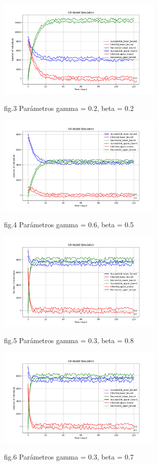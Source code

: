         \begin{center}
            \includegraphics[width=0.6\textwidth]{images/plot0.png}
            \begin{center}
               fig.3 Parámetros  gamma = 0.2, beta = 0.2
            \end{center}
            
            \includegraphics[width=0.6\textwidth]{images/plot1.png}
            \begin{center}
                fig.4 Parámetros  gamma = 0.6, beta = 0.5
            \end{center}
            
            \includegraphics[width=0.6\textwidth]{images/plot2.png}
            \begin{center}
                fig.5 Parámetros  gamma = 0.3, beta = 0.8
            \end{center}
            
            \includegraphics[width=0.6\textwidth]{images/plot2.png}
            \begin{center}
                fig.6 Parámetros  gamma = 0.3, beta = 0.7
            \end{center}
    \end{center}


